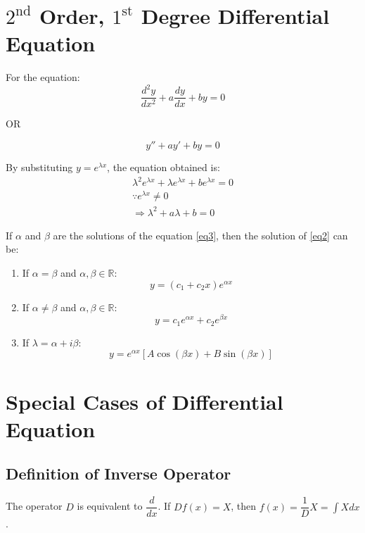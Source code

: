 \documentclass[openany, oneside]{book}
\begin{document}
\section{$2^\text{nd}$ Order, $1^\text{st}$ Degree Differential Equation}
For the equation:
\begin{equation}
\dfrac{d^2 y}{dx^2}+a\dfrac{dy}{dx}+by=0\label{eq2}
\end{equation}
\begin{center}
OR
\end{center}
\begin{equation}
y''+ay'+by=0
\end{equation}

By substituting $y=e^{\lambda x}$, the equation obtained is:
\begin{align}
\lambda^2 e^{\lambda x}+\lambda e^{\lambda x}+be^{\lambda x}=0\nonumber\\
\because e^{\lambda x} \neq 0\nonumber\\
\Rightarrow \lambda^2+a\lambda+b=0\label{eq3}
\end{align}

If $\alpha$ and $\beta$ are the solutions of the equation \ref{eq3}, then the solution of \ref{eq2} can be:
\begin{enumerate}

\item If $\alpha = \beta$ and $\alpha,\beta\in\mathbb{R}$:
\begin{equation}
y=(c_1+c_2x)e^{\alpha x}
\end{equation}

\item If $\alpha \neq \beta$ and $\alpha,\beta\in\mathbb{R}$:
\begin{equation}
y=c_1 e^{\alpha x}+c_2 e^{\beta x}
\end{equation}

\item If $\lambda = \alpha + i \beta$:
\begin{equation}
y=e^{\alpha x}\left[A\cos (\beta x)+B\sin (\beta x) \right]
\end{equation}
\end{enumerate}

\section{Special Cases of Differential Equation}
\subsection{Definition of Inverse Operator}
The operator $D$ is equivalent to $\dfrac{d}{dx}$. If $Df(x)=X$, then $f(x)=\dfrac{1}{D}X=\int X dx$.
\end{document}
